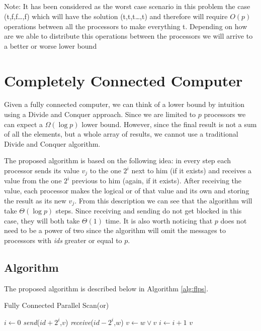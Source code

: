 \documentclass[a4paper]{article}
\title{\HWTitle \\ \vspace{.25cm} \large\HWSubtitle}
\author{\HWAuthorName}
\date{\HWDueDate}
\begin{document}
\maketitle
\thispagestyle{fancy}

{\small Note: It has been considered as the worst case scenario in this problem the case (t,f,f\ldots,f) which will have the solution (t,t,t\ldots,t) and therefore will require $O(p)$ operations between all the processors to make everything t. Depending on how are we able to distribute this operations between the processors we will arrive to a better or worse lower bound}

\section{Completely Connected Computer}
    Given a fully connected computer, we can think of a lower bound by intuition using a Divide and Conquer approach. Since we are limited to $p$ processors we can expect a $\Omega(\log p)$ lower bound. However, since the final result is not a sum of all the elements, but a whole array of results, we cannot use a traditional Divide and Conquer algorithm.

    The proposed algorithm is based on the following idea: in every step each processor sends its value $v_j$ to the one $2^i$ next to him (if it exists) and receives a value from the one $2^i$ previous to him (again, if it exists). After receiving the value, each processor makes the logical or of that value and its own and storing the result as its new $v_j$. From this description we can see that the algorithm will take $\Theta(\log p)$ steps. Since receiving and sending do not get blocked in this case, they will both take $\Theta(1)$ time. It is also worth noticing that $p$ does not need to be a power of two since the algorithm will omit the messages to processors with \emph{ids} greater or equal to $p$.

    \subsection{Algorithm}
    The proposed algorithm is described below in Algorithm \ref{alg:flps}.

    \begin{algorithm}
        \caption{Fully Connected Parallel Scan(or)}\label{alg:flps}
        \begin{algorithmic}[1]
            \Statex
                \State $i \gets 0$
                        \State \emph{send}($id+2^i$,$v$)
                    \EndIf
                        \State \emph{receive}($id-2^i$,$w$)
                        \State $v \gets w \vee v$
                    \EndIf
                    \State $i \gets i + 1$
                \EndWhile
                \State \Return $v$
            \EndProcedure
        \end{algorithmic}
    \end{algorithm}
\end{document}
